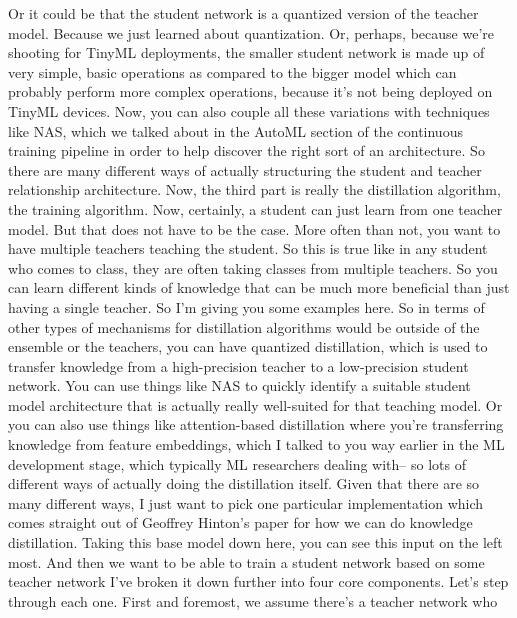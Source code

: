{{{{{    Or it could be that the student network is a quantized version of the teacher
    model.
    Because we just learned about quantization.
    Or, perhaps, because we're shooting for TinyML deployments,
    the smaller student network is made up of very simple,
    basic operations as compared to the bigger model which can probably
    perform more complex operations, because it's not
    being deployed on TinyML devices.
    Now, you can also couple all these variations
    with techniques like NAS, which we talked
    about in the AutoML section of the continuous training pipeline
    in order to help discover the right sort of an architecture.
    So there are many different ways of actually structuring the student
    and teacher relationship architecture.
    Now, the third part is really the distillation algorithm, the training
    algorithm.
    Now, certainly, a student can just learn from one teacher model.
    But that does not have to be the case.
    More often than not, you want to have multiple teachers teaching the student.
    So this is true like in any student who comes to class,
    they are often taking classes from multiple teachers.
    So you can learn different kinds of knowledge
    that can be much more beneficial than just having a single teacher.
    So I'm giving you some examples here.
    So in terms of other types of mechanisms for distillation algorithms
    would be outside of the ensemble or the teachers,
    you can have quantized distillation, which
    is used to transfer knowledge from a high-precision teacher
    to a low-precision student network.
    You can use things like NAS to quickly identify a suitable student model
    architecture that is actually really well-suited for that teaching model.
    Or you can also use things like attention-based distillation where
    you're transferring knowledge from feature embeddings,
    which I talked to you way earlier in the ML development stage,
    which typically ML researchers dealing with--
    so lots of different ways of actually doing the distillation itself.
    Given that there are so many different ways,
    I just want to pick one particular implementation which
    comes straight out of Geoffrey Hinton's paper for how
    we can do knowledge distillation.
    Taking this base model down here, you can see this input on the left most.
    And then we want to be able to train a student network based on some teacher
    network
    I've broken it down further into four core components.
    Let's step through each one.
    First and foremost, we assume there's a teacher network who
}}}}}
